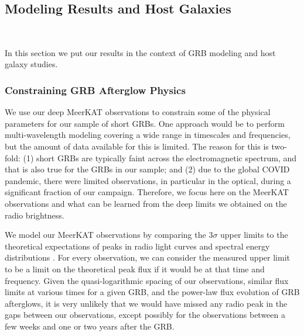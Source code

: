 \documentclass[12pt]{article}
\begin{document}
\subsection{Modeling Results and Host Galaxies}
~\label{sec:methodandresult5}

In this section we put our results in the context of GRB modeling and host galaxy studies.
\subsubsection{Constraining GRB Afterglow Physics}

We use our deep MeerKAT observations to constrain some of the physical parameters for our sample of short GRBs. One approach would be to perform multi-wavelength modeling covering a wide range in timescales and frequencies, but the amount of data available for this is limited. The reason for this is two-fold: (1) short GRBs are typically faint across the electromagnetic spectrum, and that is also true for the GRBs in our sample; and (2) due to the global COVID pandemic, there were limited observations, in particular in the optical, during a significant fraction of our campaign. Therefore, we focus here on the MeerKAT observations and what can be learned from the deep limits we obtained on the radio brightness.

We model our MeerKAT observations by comparing the $3\sigma$ upper limits to the theoretical expectations of peaks in radio light curves and spectral energy distributions \citep{2017MNRAS.472.3161B,2023MNRAS.518.1522D}. For every observation, we can consider the measured upper limit to be a limit on the theoretical peak flux if it would be at that time and frequency. Given the quasi-logarithmic spacing of our observations, similar flux limits at various times for a given GRB, and the power-law flux evolution of GRB afterglows, it is very unlikely that we would have missed any radio peak in the gaps between our observations, except possibly for the observations between a few weeks and one or two years after the GRB. 
\end{document}
